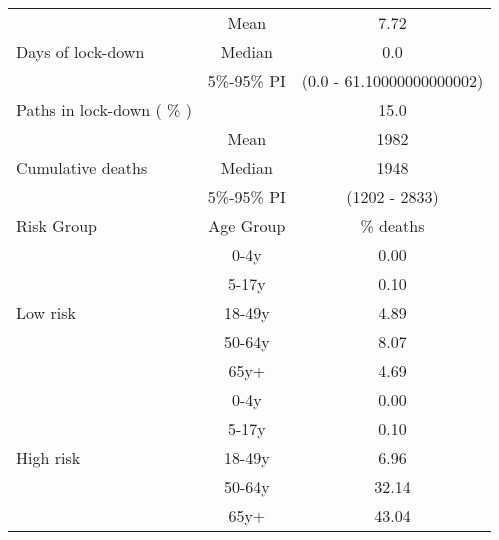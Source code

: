 \documentclass{article}
\begin{document}
\begin{table}[th]
\centering
\begin{tabular}{p{4cm}cc}
\toprule
\multirow{3}{*}{Days   of lock-down} & Mean      & 7.72                        \\ \cmidrule(l){2-3} 
                                     & Median    & 0.0                      \\ \cmidrule(l){2-3} 
                                     & 5\%-95\% PI & (0.0 - 61.10000000000002)       \\ \midrule 
\multirow{1}{*}{Paths in lock-down ( \% )} &      &         15.0              \\   \midrule                     
\multirow{3}{\hsize}{Cumulative deaths}       & Mean      & 1982 \\ \cmidrule(l){2-3} 
                                     & Median    & 1948                        \\ \cmidrule(l){2-3} 
                                     & 5\%-95\% PI & (1202 - 2833)           \\  \midrule
Risk Group                           & Age Group & \multicolumn{1}{c}{\% deaths}        \\  \midrule
\multirow{5}{*}{Low   risk}          & 0-4y      & 0.00                         \\ \cmidrule(l){2-3} 
                                     & 5-17y     & 0.10                         \\ \cmidrule(l){2-3} 
                                     & 18-49y    & 4.89                         \\ \cmidrule(l){2-3} 
                                     & 50-64y    & 8.07                         \\ \cmidrule(l){2-3} 
                                     & 65y+      & 4.69                         \\ \midrule
\multirow{5}{*}{High   risk}         & 0-4y      & 0.00                         \\ \cmidrule(l){2-3} 
                                     & 5-17y     & 0.10                         \\ \cmidrule(l){2-3} 
                                     & 18-49y    & 6.96                         \\ \cmidrule(l){2-3} 
                                     & 50-64y    & 32.14                         \\ \cmidrule(l){2-3} 
                                     & 65y+      & 43.04                         \\ \midrule

\end{tabular}
\end{table}
\end{document}
